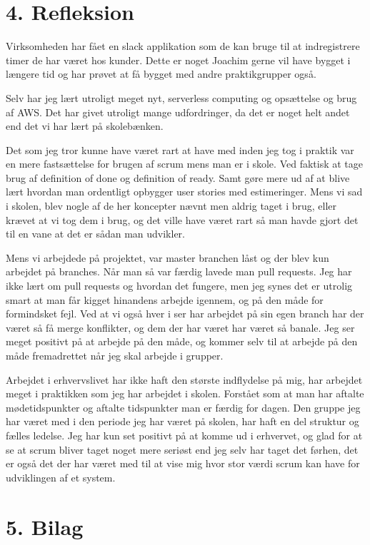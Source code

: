 \documentclass[11pt]{report}
\begin{document}
\chapter*{4. Refleksion}
Virksomheden har fået en slack applikation som de kan bruge til at indregistrere timer de har været hos kunder. 
Dette er noget Joachim gerne vil have bygget i længere tid og har prøvet at få bygget med andre praktikgrupper også. 

Selv har jeg lært utroligt meget nyt, serverless computing og opsættelse og brug af AWS. Det har givet utroligt mange 
udfordringer, da det er noget helt andet end det vi har lært på skolebænken. 

Det som jeg tror kunne have været rart at have med inden jeg tog i praktik var en mere fastsættelse for brugen 
af scrum mens man er i skole. Ved faktisk at tage brug af definition of done og definition of ready. Samt gøre mere 
ud af at blive lært hvordan man ordentligt opbygger user stories med estimeringer. Mens vi sad i skolen, blev nogle 
af de her koncepter nævnt men aldrig taget i brug, eller krævet at vi tog dem i brug, og det ville have været rart 
så man havde gjort det til en vane at det er sådan man udvikler. 

Mens vi arbejdede på projektet, var master branchen låst og der blev kun arbejdet på branches. Når man så var færdig 
lavede man pull requests. Jeg har ikke lært om pull requests og hvordan det fungere, men jeg synes det er utrolig smart 
at man får kigget hinandens arbejde igennem, og på den måde for formindsket fejl. Ved at vi også hver i ser har arbejdet 
på sin egen branch har der været så få merge konflikter, og dem der har været har været så banale. Jeg ser meget positivt på 
at arbejde på den måde, og kommer selv til at arbejde på den måde fremadrettet når jeg skal arbejde i grupper.

Arbejdet i erhvervslivet har ikke haft den største indflydelse på mig, har arbejdet meget i praktikken som jeg har arbejdet i skolen. 
Forstået som at man har aftalte mødetidspunkter og aftalte tidspunkter man er færdig for dagen. 
Den gruppe jeg har været med i den periode jeg har været på skolen, har haft en del struktur og fælles ledelse. 
Jeg har kun set positivt på at komme ud i erhvervet, og glad for at se at scrum bliver taget noget mere seriøst end jeg selv 
har taget det førhen, det er også det der har været med til at vise mig hvor stor værdi scrum kan have for udviklingen af et system. 

\chapter*{5. Bilag}
\end{document}
